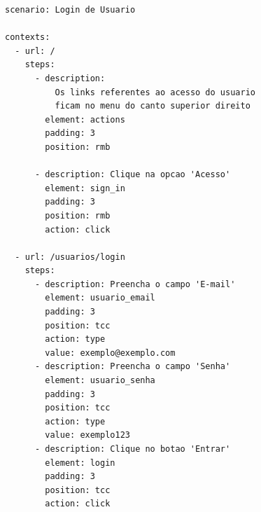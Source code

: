 {\singlespace
\begin{lstlisting}[caption=Exemplo de cenário escrito em \textit{YAML},label={lst:codigo38}]
scenario: Login de Usuario

contexts:
  - url: /
    steps:
      - description:
          Os links referentes ao acesso do usuario
          ficam no menu do canto superior direito
        element: actions
        padding: 3
        position: rmb

      - description: Clique na opcao 'Acesso'
        element: sign_in
        padding: 3
        position: rmb
        action: click

  - url: /usuarios/login
    steps:
      - description: Preencha o campo 'E-mail'
        element: usuario_email
        padding: 3
        position: tcc
        action: type
        value: exemplo@exemplo.com
      - description: Preencha o campo 'Senha'
        element: usuario_senha
        padding: 3
        position: tcc
        action: type
        value: exemplo123
      - description: Clique no botao 'Entrar'
        element: login
        padding: 3
        position: tcc
        action: click
\end{lstlisting}
}

